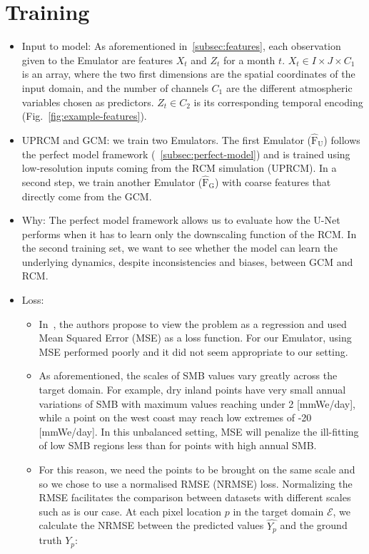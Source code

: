 \documentclass[a4paper,11pt,oneside]{report}
\begin{document}
\section{Training}\label{subsec:training}
\begin{itemize}
    \item Input to model: As aforementioned in~\ref{subsec:features}, each observation given to the Emulator are features $X_t$ and $Z_t$ for a month $t$. $X_t \in I \times J \times C_1$ is an array, where the two first dimensions are the spatial coordinates of the input domain, and the number of channels $C_1$ are the different atmospheric variables chosen as predictors. $Z_t \in C_2$ is its corresponding temporal encoding (Fig.~\ref{fig:example-features}).
    \item UPRCM and GCM: we train two Emulators. The first Emulator ($\operatorname{\hat{F}_U}$) follows the perfect model framework (~\ref{subsec:perfect-model}) and is trained using low-resolution inputs coming from the RCM simulation (UPRCM). In a second step, we train another Emulator ($\operatorname{\hat{F}_G}$) with coarse features that directly come from the GCM. 
    \item Why: The perfect model framework allows us to evaluate how the U-Net performs when it has to learn only the downscaling function of the RCM. In the second training set, we want to see whether the model can learn the underlying dynamics, despite inconsistencies and biases, between GCM and RCM. 
    \item Loss: 
    \begin{itemize}
        \item In~\cite{Doury}, the authors propose to view the problem as a regression and used Mean Squared Error (MSE) as a loss function. For our Emulator, using MSE performed poorly and it did not seem appropriate to our setting. 
        \item As aforementioned, the scales of SMB values vary greatly across the target domain. For example, dry inland points have very small annual variations of SMB with maximum values reaching under 2 [mmWe/day], while a point on the west coast may reach low extremes of -20 [mmWe/day]. In this unbalanced setting, MSE will penalize the ill-fitting of low SMB regions less than for points with high annual SMB.  
        \item For this reason, we need the points to be brought on the same scale and so we chose to use a normalised RMSE (NRMSE) loss. Normalizing the RMSE facilitates the comparison between datasets with different scales such as is our case. At each pixel location $p$ in the target domain $\mathcal{E}$, we calculate the NRMSE between the predicted values $\widehat{Y_{p}}$ and the ground truth $Y_{p}$:

\end{itemize}
\end{itemize}
\end{document}

